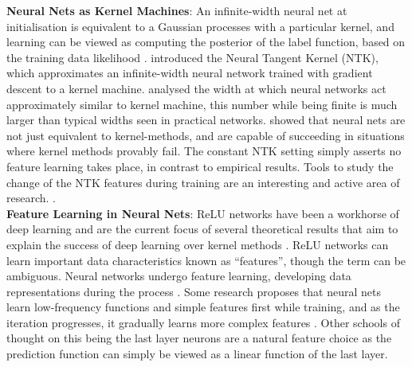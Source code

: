 \documentclass{article} %
\renewcommand{\>}{{\rightarrow}}
\renewcommand{\=}{\stackrel{\triangle}{=}}
\newcommand{\0}{{\mathbf 0}}
\begin{document}
\textbf{Neural Nets as Kernel Machines}: An infinite-width neural net at initialisation is equivalent to a Gaussian processes with a particular kernel, and learning can be viewed as computing the posterior of the label function, based on the training data likelihood \citep{lee2017deep}.  \citet{Jacot+18} introduced the Neural Tangent Kernel (NTK), which approximates an infinite-width neural network trained with gradient descent to a kernel machine. \citet{Arora+19} analysed the width at which neural networks act approximately similar to kernel machine, this number while being finite is much larger than typical widths seen in practical networks. \citet{Daniely20} showed that neural nets are not just equivalent to kernel-methods, and are capable of succeeding in situations where kernel methods provably fail.  The constant NTK setting simply asserts no feature learning takes place, in contrast to empirical results. Tools to study the change of the NTK features during training are an interesting and active area of research. \citep{Atanasov+22,Damian22,hu2020surprising,ba2022high,Chizat+19,liu2020linearity}.\\

\textbf{Feature Learning in Neural Nets}: ReLU networks \citep{fukushima1969visual} have been a workhorse of deep learning and are the current focus of several theoretical results that aim to explain the success of deep learning over kernel methods \citep{ghorbani2020neural}. ReLU networks can learn important data characteristics known as ``features'', though the term can be ambiguous. Neural networks undergo feature learning, developing data representations during the process \citep{Damian22}. Some research proposes that neural nets learn low-frequency functions \citep{rahaman2019spectral,cao2019towards} and simple features \citep{shah2020pitfalls} first while training, and as the iteration progresses, it gradually learns more complex features \citep{kalimeris2019sgd,hu2020surprising}. Other schools of thought on this being the last layer neurons \citep{daniely2017sgd,lee2019wide} are a natural feature choice as the prediction function can simply be viewed as a linear function of the last layer. 
\end{document}
